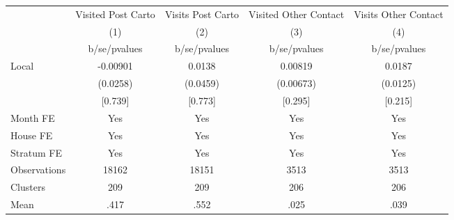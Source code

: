 {
\def\sym#1{\ifmmode^{#1}\else\(^{#1}\)\fi}
\begin{tabular}{l*{4}{c}}
\toprule
                &\multicolumn{1}{c}{Visited Post Carto}&\multicolumn{1}{c}{Visits Post Carto}&\multicolumn{1}{c}{Visited Other Contact}&\multicolumn{1}{c}{Visits Other Contact}\\
                &\multicolumn{1}{c}{(1)}&\multicolumn{1}{c}{(2)}&\multicolumn{1}{c}{(3)}&\multicolumn{1}{c}{(4)}\\
                &b/se/pvalues&b/se/pvalues&b/se/pvalues&b/se/pvalues\\
\midrule
Local           & -0.00901&   0.0138&  0.00819&   0.0187\\
                & (0.0258)& (0.0459)&(0.00673)& (0.0125)\\
                &  [0.739]&  [0.773]&  [0.295]&  [0.215]\\
Month FE        &      Yes&      Yes&      Yes&      Yes\\
House FE        &      Yes&      Yes&      Yes&      Yes\\
Stratum FE      &      Yes&      Yes&      Yes&      Yes\\
\midrule
Observations    &    18162&    18151&     3513&     3513\\
Clusters        &      209&      209&      206&      206\\
Mean            &     .417&     .552&     .025&     .039\\
\bottomrule
\end{tabular}
}
